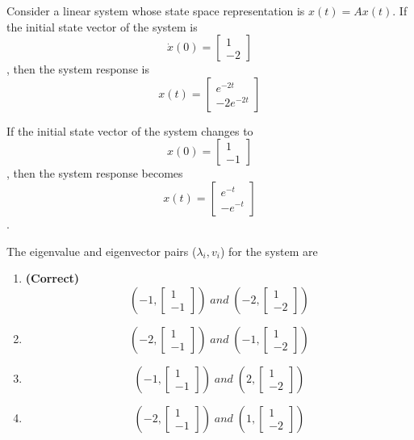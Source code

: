\documentclass[11pt,a4paper]{article}
\begin{document}
\noindent Consider a linear system whose state space representation is $x(t)=Ax(t)$. If the initial state vector of the system is 
\[
\dot{x}(0)=\begin{bmatrix} 1\\ -2 \end{bmatrix}
\]
, then the system response is  
\[
x(t)=\begin{bmatrix} e^{-2t}\\ -2e^{-2t} \end{bmatrix}
\]
 
If the initial state vector of the system changes to 
\[
x(0)=\begin{bmatrix} 1\\ -1 \end{bmatrix}
\]
, then the system response becomes  
\[
x(t)=\begin{bmatrix} e^{-t}\\ -e^{-t} \end{bmatrix}
\]
. 

The eigenvalue and eigenvector pairs ($\lambda _{i},v_{i}$) for the system are


\begin{enumerate}[label=(\Alph*)]
    \item \textbf{(Correct)} \[
(-1, \begin{bmatrix} 1\\ -1 \end{bmatrix})\; and \;(-2,\begin{bmatrix} 1\\ -2 \end{bmatrix})
\]
    \item \[
(-2, \begin{bmatrix} 1\\ -1 \end{bmatrix})\; and \;(-1,\begin{bmatrix} 1\\ -2 \end{bmatrix})
\]
    \item \[
(-1, \begin{bmatrix} 1\\ -1 \end{bmatrix})\; and \; (2, \begin{bmatrix} 1\\ -2 \end{bmatrix})
\]
    \item \[
(-2, \begin{bmatrix} 1\\ -1 \end{bmatrix})\; and \;(1,\begin{bmatrix} 1\\ -2 \end{bmatrix})
\]
\end{enumerate}
\end{document}
